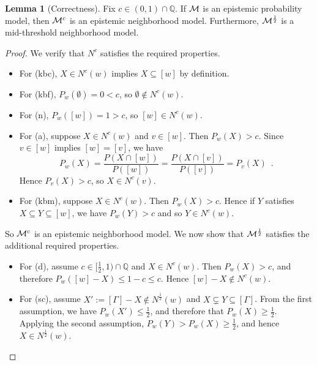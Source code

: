 \documentclass[12pt]{article}
\theoremstyle{definition}
\newtheorem{lemma}[theorem]{Lemma}
\newcommand{\Rat}{\mathbb{Q}}  %
\newcommand{\M}{{\cal M}}      %
\begin{document}
\begin{lemma}[Correctness]
  \label{lemma:correctness}
  Fix $c\in(0,1)\cap\Rat$.  If $\M$ is an epistemic probability model,
  then $\M^c$ is an epistemic neighborhood model.  Furthermore,
  $\M^{\frac 12}$ is a mid-threshold neighborhood model.
\end{lemma}
\begin{proof}
  We verify that $N^c$ satisfies the required properties.
  \begin{itemize}
  \item For (kbc), $X\in N^c(w)$ implies $X\subseteq[w]$ by
    definition.

  \item For (kbf), $P_w(\emptyset)=0<c$, so $\emptyset\notin N^c(w)$.

  \item For (n), $P_w([w]) = 1 > c$, so
    $[w] \in N^c(w)$.

  \item For (a), suppose $X \in N^c(w)$ and $v\in [w]$.  Then
    $P_w(X)>c$.  Since $v\in [w]$ implies $[w] = [v]$, we
    have
    \[
    P_w(X) = 
    \frac{P(X\cap[w])}{P([w])} =
    \frac{P(X\cap[v])}{P([v])} =
    P_{v}(X) \enspace.
    \]
    Hence $P_{v}(X)>c$, so $X \in N^c(v)$.

  \item For (kbm), suppose $X \in N^c(w)$.  Then $P_w(X)>c$.
    Hence if $Y$ satisfies $X \subseteq Y \subseteq [w]$, we have
    $P_w(Y)>c$ and so $Y \in N^c(w)$.
  \end{itemize}
  So $\M^c$ is an epistemic neighborhood model.  We now show that
  $\M^{\frac 12}$ satisfies the additional required properties.
  \begin{itemize}
  \item For (d), assume $c\in[\frac 12,1)\cap\Rat$ and $X \in
    N^c(w)$.  Then $P_w(X) > c$, and therefore $P_w([w] -
    X) \leq 1-c\leq c$. Hence $[w] - X \notin N^c(w)$.

  \item For (sc), assume $X':=[\Gamma]-X\notin N^{\frac 12}(w)$
    and $X\subsetneq Y\subseteq[\Gamma]$.  From the first
    assumption, we have $P_w(X') \leq \frac 12$, and therefore
    that $P_w(X)\geq \frac 12$.  Applying the second assumption,
    $P_w(Y) > P_w(X)\geq \frac 12$, and hence $X\in N^{\frac
      12}(w)$.


\end{itemize}
\end{proof}
\end{document}
